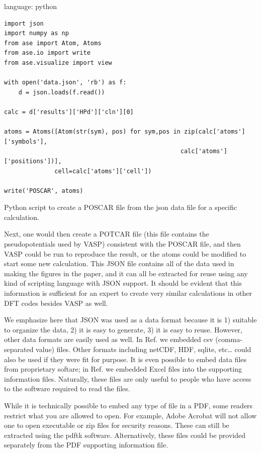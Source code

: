 \documentclass[journal=accacs,manuscript=article,email=true]{achemso}
\begin{document}
\begin{tcolorbox}
language: python\begin{listing}[H]
\begin{verbatim}
import json
import numpy as np
from ase import Atom, Atoms
from ase.io import write
from ase.visualize import view

with open('data.json', 'rb') as f:
    d = json.loads(f.read())

calc = d['results']['HPd']['cln'][0]

atoms = Atoms([Atom(str(sym), pos) for sym,pos in zip(calc['atoms']['symbols'],
                                                 calc['atoms']['positions'])],
              cell=calc['atoms']['cell'])

write('POSCAR', atoms)
\end{verbatim}
\caption{Python script to create a POSCAR file from the json data file for a specific calculation. \label{code-poscar}}
\end{listing}
\end{tcolorbox}

Next, one would then create a POTCAR file (this file contains the pseudopotentials used by VASP)  consistent with the POSCAR file, and then VASP could be run to reproduce the result, or the atoms could be modified to start some new calculation. This JSON file contains all of the data used in making the figures in the paper, and it can all be extracted for reuse using any kind of scripting language with JSON support. It should be evident that this information is sufficient for an expert to create very similar calculations in other DFT codes besides VASP as well.

We emphasize here that JSON was used as a data format because it is 1) suitable to organize the data, 2) it is easy to generate, 3) it is easy to reuse.  However, other data formats are easily used as well. In Ref.  we embedded csv (comma-separated value) files. Other formats including netCDF, HDF, sqlite, etc\ldots{} could also be used if they were fit for purpose. It is even possible to embed data files from proprietary softare; in Ref.  we embedded Excel files into the supporting information files. Naturally, these files are only useful to people who have access to the software required to read the files.

While it is technically possible to embed any type of file in a PDF, some readers restrict what you are allowed to open. For example, Adobe Acrobat will not allow one to open executable or zip files for security reasons. These can still be extracted using the pdftk software. Alternatively, these files could be provided separately from the PDF supporting information file.
\end{document}
